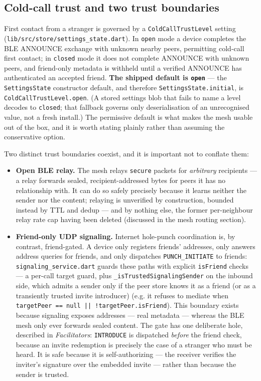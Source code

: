 \documentclass[11pt]{report}
\newcommand{\code}[1]{\texttt{\small #1}}
\begin{document}
\subsection{Cold-call trust and two trust boundaries}

First contact from a stranger is governed by a \code{ColdCallTrustLevel} setting (\code{lib/src/store/settings\_state.dart}). In \code{open} mode a device completes the BLE ANNOUNCE exchange with unknown nearby peers, permitting cold-call first contact; in \code{closed} mode it does not complete ANNOUNCE with unknown peers, and friend-only metadata is withheld until a verified ANNOUNCE has authenticated an accepted friend. \textbf{The shipped default is \code{open}} --- the \code{SettingsState} constructor default, and therefore \code{SettingsState.initial}, is \code{ColdCallTrustLevel.open}. (A stored settings blob that fails to name a level decodes to \code{closed}; that fallback governs only deserialisation of an unrecognised value, not a fresh install.) The permissive default is what makes the mesh usable out of the box, and it is worth stating plainly rather than assuming the conservative option.

Two distinct trust boundaries coexist, and it is important not to conflate them:

\begin{itemize}
  \item \textbf{Open BLE relay.} The mesh relays \code{secure} packets for \emph{arbitrary} recipients — a relay forwards sealed, recipient-addressed bytes for peers it has no relationship with. It can do so safely precisely because it learns neither the sender nor the content; relaying is unverified by construction, bounded instead by TTL and dedup --- and by nothing else, the former per-neighbour relay rate cap having been deleted (discussed in the mesh routing section).
  \item \textbf{Friend-only UDP signaling.} Internet hole-punch coordination is, by contrast, friend-gated. A device only registers friends' addresses, only answers address queries for friends, and only dispatches \code{PUNCH\_INITIATE} to friends: \code{signaling\_service.dart} guards these paths with explicit \code{isFriend} checks — a per-call target guard, plus \code{\_isTrustedSignalingSender} on the inbound side, which admits a sender only if the peer store knows it as a friend (or as a transiently trusted invite introducer) (e.g. it refuses to mediate when \code{targetPeer == null || !targetPeer.isFriend}). This boundary exists because signaling exposes addresses — real metadata — whereas the BLE mesh only ever forwards sealed content. The gate has one deliberate hole, described in \emph{Facilitators}: \code{INTRODUCE} is dispatched \emph{before} the friend check, because an invite redemption is precisely the case of a stranger who must be heard. It is safe because it is self-authorizing — the receiver verifies the inviter's signature over the embedded invite — rather than because the sender is trusted.
\end{itemize}
\end{document}
